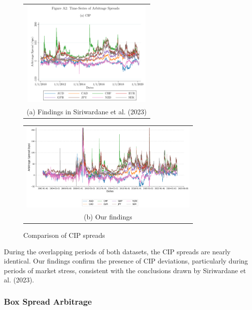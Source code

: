 \documentclass{article}
\begin{document}
\begin{appendices}
\begin{figure}
  \centering
  \begin{tabular}{@{}c@{}}
    \includegraphics[width=.7\linewidth,height=150pt]{../docs_src/SegArb_CIP_Timeseries.png} \\[\abovecaptionskip]
    \small (a) Findings in Siriwardane et al. (2023)
  \end{tabular}

  \vspace{\floatsep}

  \begin{tabular}{@{}c@{}}
    \includegraphics[width=.7\linewidth,height=125pt]{../docs_src/CIP_replicate.png} \\[\abovecaptionskip]
    \small (b) Our findings
  \end{tabular}

  \caption{Comparison of CIP spreads}\label{fig:myfig}
\end{figure}




During the overlapping periods of both datasets, the CIP spreads are nearly identical.
Our findings confirm the presence of CIP deviations, particularly during periods of
market stress, consistent with the conclusions drawn by Siriwardane et al. (2023).


\subsubsection{Box Spread Arbitrage}


\end{appendices}
\end{document}
